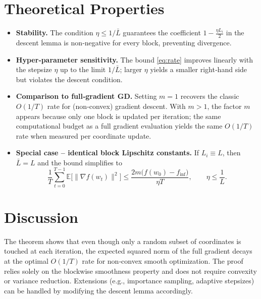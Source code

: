 \documentclass{article}
\newcommand{\E}{\mathbb{E}}
\begin{document}
\section*{Theoretical Properties}
\begin{itemize}
\item \textbf{Stability.} The condition $\eta\le 1/\bar L$ guarantees the
coefficient $1-\frac{\eta L_i}{2}$ in the descent lemma is non‑negative for every block, preventing divergence.
\item \textbf{Hyper‑parameter sensitivity.} The bound \eqref{eq:rate}
improves linearly with the stepsize $\eta$ up to the limit $1/\bar L$; larger $\eta$ yields a smaller right‑hand side but violates the descent condition.
\item \textbf{Comparison to full‑gradient GD.} Setting $m=1$ recovers the classic
$O(1/T)$ rate for (non‑convex) gradient descent. With $m>1$, the factor $m$ appears because only one block is updated per iteration; the same computational budget as a full gradient evaluation yields the same $O(1/T)$ rate when measured per coordinate update.
\item \textbf{Special case – identical block Lipschitz constants.} If $L_i\equiv L$, then $\bar L=L$ and the bound simplifies to
\[
\frac{1}{T}\sum_{t=0}^{T-1}\E\!\bigl[\|\nabla f(w_t)\|^{2}\bigr]
\le \frac{2m\bigl(f(w_{0})-f_{\inf}\bigr)}{\eta T},
\qquad \eta\le\frac{1}{L}.
\]
\end{itemize}

\section*{Discussion}
The theorem shows that even though only a random subset of coordinates is
touched at each iteration, the expected squared norm of the full gradient
decays at the optimal $O(1/T)$ rate for non‑convex smooth optimization.
The proof relies solely on the blockwise smoothness property and does not
require convexity or variance reduction. Extensions (e.g., importance
sampling, adaptive stepsizes) can be handled by modifying the descent
lemma accordingly.

\newpage
\end{document}
